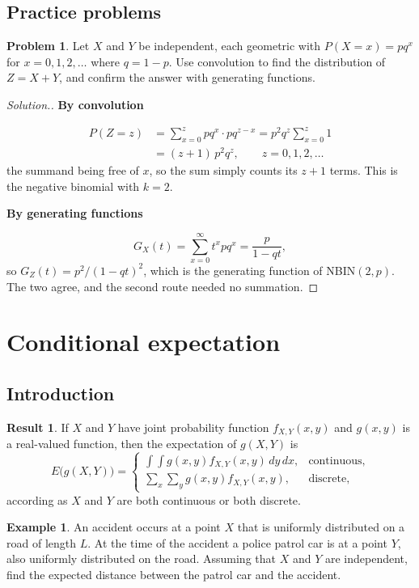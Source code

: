 \documentclass[11pt,a4paper]{article}
\theoremstyle{definition}
\newtheorem{exa}[thm]{Example}
\newtheorem{result}[thm]{Result}
\newtheorem{problemx}{Problem}[subsection]
\newenvironment{problem}{\begin{problemx}}{\end{problemx}}
\newenvironment{solution}
  {\renewcommand{\qedsymbol}{}\begin{proof}[\textit{Solution}.]}
  {\end{proof}}
\newcommand{\subhead}[1]{%
  \par\medskip\noindent\textbf{#1}\par\nobreak\smallskip}
\begin{document}
\subsection{Practice problems}

\begin{problem}
Let $X$ and $Y$ be independent, each geometric with $P(X=x) = pq^{x}$ for
$x=0,1,2,\dots$ where $q=1-p$. Use convolution to find the distribution of
$Z=X+Y$, and confirm the answer with generating functions.
\end{problem}
\begin{solution}
\subhead{By convolution}
\begin{align*}
P(Z=z) &= \sum_{x=0}^{z} pq^{x}\cdot pq^{z-x} = p^{2}q^{z}\sum_{x=0}^{z}1 \\
&= (z+1)\,p^{2}q^{z},\qquad z=0,1,2,\dots
\end{align*}
the summand being free of $x$, so the sum simply counts its $z+1$ terms. This is
the negative binomial with $k=2$.

\subhead{By generating functions}
$$G_X(t) = \sum_{x=0}^{\infty}t^{x}pq^{x} = \frac{p}{1-qt},$$
so $G_Z(t) = p^{2}/(1-qt)^{2}$, which is the generating function of NBIN$(2,p)$.
The two agree, and the second route needed no summation.
\end{solution}


\section{Conditional expectation}
\subsection{Introduction}
\begin{result}
If $X$ and $Y$ have joint probability function $f_{X,Y}(x, y)$ and $g(x, y)$ is a real-valued function, then the expectation of $g(X, Y)$ is
\[
E\bigl(g(X, Y)\bigr) = \begin{cases} \displaystyle\int\!\!\int g(x, y)f_{X,Y}(x, y)\,dy\,dx , & \text{continuous} , \\[2ex] \displaystyle\sum_x\sum_yg(x, y)f_{X,Y}(x, y) , & \text{discrete,} \end{cases}
\]
according as $X$ and $Y$ are both continuous or both discrete.
\end{result}

\begin{exa}\label{exa:police}
An accident occurs at a point $X$ that is uniformly distributed on a road of length $L$. At the time of the accident a police patrol car
is at a point $Y$, also uniformly distributed on the road. Assuming that $X$ and $Y$ are independent, find the expected distance
between the patrol car and the accident.
\end{exa}
\end{document}
